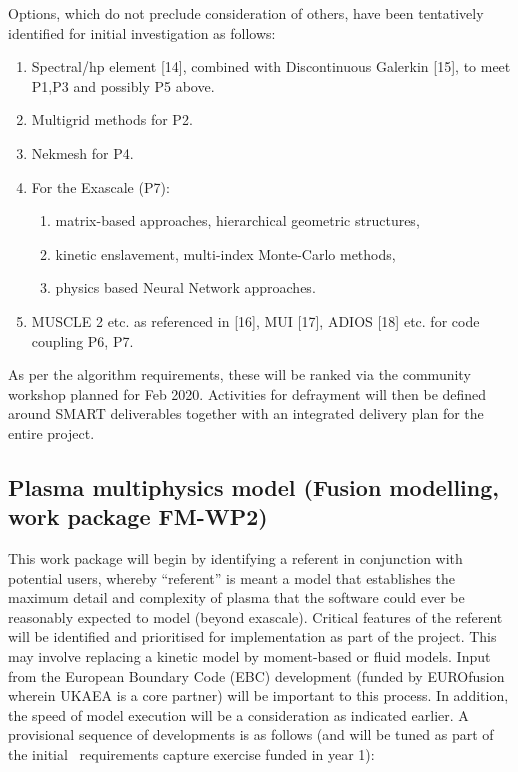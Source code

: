 Options, which do not preclude consideration of others, have 
been tentatively identified for initial investigation as follows:

\begin{enumerate}
\item Spectral/hp element [14], combined with Discontinuous  Galerkin 
[15], to meet P1,P3 and possibly P5 above.

\item Multigrid methods for P2.

\item Nekmesh for P4.

\item For the Exascale (P7):

\begin{enumerate}
\item matrix-based approaches, hierarchical geometric structures,

\item kinetic enslavement, multi-index Monte-Carlo methods,

\item physics based Neural Network approaches.
\end{enumerate}

\item MUSCLE 2 etc. as referenced in [16], MUI [17], ADIOS [18] etc. 
for code coupling P6, P7.
\end{enumerate}

As per the algorithm requirements, these will be ranked via the community workshop 
planned for Feb 2020. Activities for defrayment will then be defined around SMART 
deliverables together with an integrated delivery plan for the entire project.

\subsection*{\textbf{Plasma multiphysics model} (Fusion modelling, work package \textbf{FM-WP2})}

This work package will begin by identifying a referent in conjunction with potential 
users, whereby ``referent'' is meant a model that establishes the maximum detail 
and complexity of plasma that the software could ever be reasonably expected to 
model (beyond exascale).  Critical features of the referent will be identified 
and prioritised for implementation as part of the project. This may involve replacing 
a kinetic model by moment-based or fluid models. Input from the European Boundary 
Code (EBC) development (funded by EUROfusion wherein UKAEA is a core partner) will 
be important to this process. In addition, the speed of model execution will be 
a consideration as indicated earlier. A provisional sequence of developments is 
as follows (and will be tuned as part of the initial \nep \   requirements capture 
exercise funded in year 1):

